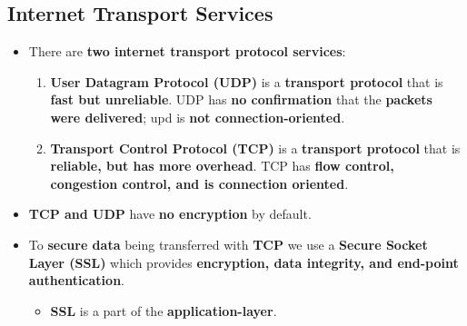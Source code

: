 \documentclass{article}
\begin{document}
    \subsection*{Internet Transport Services}
    \begin{itemize}
        \item There are \textbf{two internet transport protocol services}:
        \begin{enumerate}
            \item \textbf{User Datagram Protocol (UDP)} is a \textbf{transport protocol} that is \textbf{fast but unreliable}. UDP has \textbf{no confirmation} that the \textbf{packets were delivered}; upd is \textbf{not connection-oriented}.
            \item \textbf{Transport Control Protocol (TCP)} is a \textbf{transport protocol} that is \textbf{reliable, but has more overhead}. TCP has \textbf{flow control, congestion control, and is connection oriented}.
        \end{enumerate}
        \item \textbf{TCP and UDP} have \textbf{no encryption} by default.
        \item To \textbf{secure data} being transferred with \textbf{TCP} we use a \textbf{Secure Socket Layer (SSL)} which provides \textbf{encryption, data integrity, and end-point authentication}.
        \begin{itemize}
            \item \textbf{SSL} is a part of the \textbf{application-layer}.
        \end{itemize}
    \end{itemize}

    \section*{}
\end{document}
